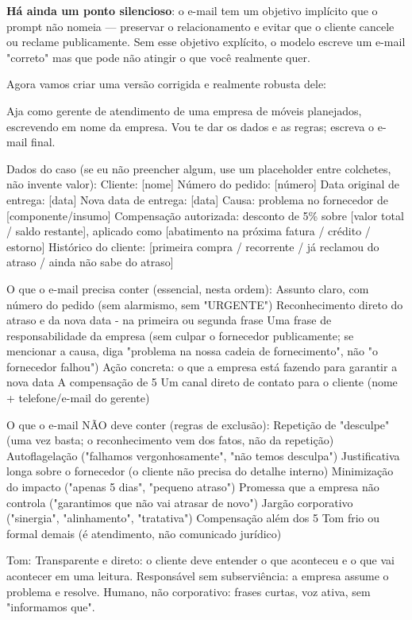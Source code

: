 \documentclass[11pt, a4paper]{article}
\begin{document}
\textbf{Há ainda um ponto silencioso}: o e-mail tem um objetivo implícito que o prompt não nomeia — preservar o relacionamento e evitar que o cliente cancele ou reclame publicamente. Sem esse objetivo explícito, o modelo escreve um e-mail "correto" mas que pode não atingir o que você realmente quer.

Agora vamos criar uma versão corrigida e realmente robusta dele:

\begin{promptbox}
Aja como gerente de atendimento de uma empresa de móveis planejados, escrevendo em nome da empresa. Vou te dar os dados e as regras; escreva o e-mail final.

Dados do caso (se eu não preencher algum, use um placeholder entre colchetes, não invente valor):
 Cliente: [nome]
 Número do pedido: [número]
 Data original de entrega: [data]
 Nova data de entrega: [data]
 Causa: problema no fornecedor de [componente/insumo]
 Compensação autorizada: desconto de 5\% sobre [valor total / saldo restante], aplicado como [abatimento na próxima fatura / crédito / estorno]
 Histórico do cliente: [primeira compra / recorrente / já reclamou do atraso / ainda não sabe do atraso]

O que o e-mail precisa conter (essencial, nesta ordem):
 Assunto claro, com número do pedido (sem alarmismo, sem "URGENTE")
 Reconhecimento direto do atraso e da nova data - na primeira ou segunda frase
 Uma frase de responsabilidade da empresa (sem culpar o fornecedor publicamente; se mencionar a causa, diga "problema na nossa cadeia de fornecimento", não "o fornecedor falhou")
 Ação concreta: o que a empresa está fazendo para garantir a nova data
 A compensação de 5%
 Um canal direto de contato para o cliente (nome + telefone/e-mail do gerente)
 
O que o e-mail NÃO deve conter (regras de exclusão):
 Repetição de "desculpe" (uma vez basta; o reconhecimento vem dos fatos, não da repetição)
 Autoflagelação ("falhamos vergonhosamente", "não temos desculpa")
 Justificativa longa sobre o fornecedor (o cliente não precisa do detalhe interno)
 Minimização do impacto ("apenas 5 dias", "pequeno atraso")
 Promessa que a empresa não controla ("garantimos que não vai atrasar de novo")
 Jargão corporativo ("sinergia", "alinhamento", "tratativa")
 Compensação além dos 5%
 Tom frio ou formal demais (é atendimento, não comunicado jurídico)

Tom:
 Transparente e direto: o cliente deve entender o que aconteceu e o que vai acontecer em uma leitura.
 Responsável sem subserviência: a empresa assume o problema e resolve.
 Humano, não corporativo: frases curtas, voz ativa, sem "informamos que".
 

\end{promptbox}
\end{document}

